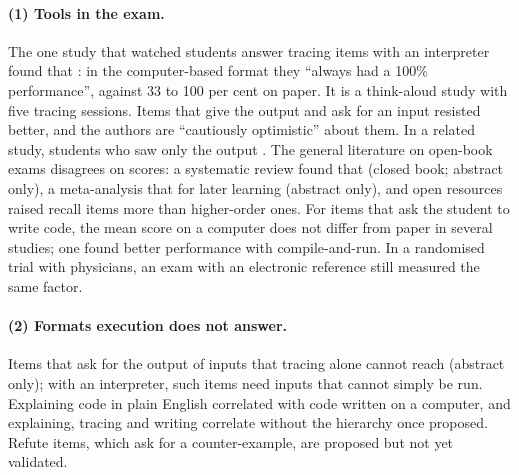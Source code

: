 \paragraph{(1) Tools in the exam.}
The one study that watched students answer tracing items with an
interpreter found that : in the computer-based format they \enquote{always had a
100\% performance}, against 33 to 100 per cent on paper.  It is a
think-aloud study with five tracing sessions.  Items that give the output
and ask for an input resisted better, and the authors are
\enquote{cautiously optimistic} about them.  In a related study, students
who saw only the output .  The general literature on open-book exams
disagrees on scores: a systematic review found that 
(closed book; abstract only), a meta-analysis that  for later
learning (abstract only), and open resources raised recall items more
than higher-order ones.\autocite[147]{Davies2022}  For items that ask the
student to write code, the mean score on a computer does not differ from
paper in several studies;\autocites{Harris2023}{Lappalainen2017}%
{Oqvist2018}{Gomm2003} one found better performance with
compile-and-run.\autocite{Rheault2023}  In a randomised trial with
physicians, an exam with an electronic reference still measured the same
factor.\autocite{Lipner2017}

\paragraph{(2) Formats execution does not answer.}
Items that ask for the output of inputs that tracing alone cannot reach
 (abstract only); with an
interpreter, such items need inputs that cannot simply be run.
Explaining code in plain English correlated with code written on a
computer,\autocite{Murphy2012} and explaining, tracing and writing
correlate without the hierarchy once proposed.\autocite{Fowler2022}
Refute items, which ask for a counter-example, are proposed but not yet
validated.\autocite{Agarwal2023}

